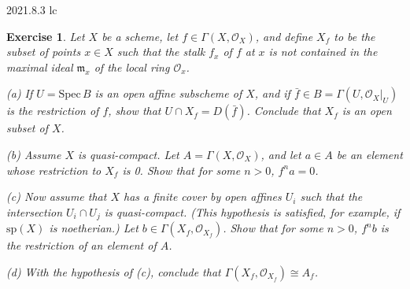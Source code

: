 \documentclass[12pt]{amsart}
\newtheorem{exe}{Exercise}[subsection]
\begin{document}
2021.8.3 lc
\begin{exe}
	\label{2.2.16}
	Let $X$ be a scheme, let $f\in\Gamma(X,\mathcal{O}_X)$, and define $X_f$ to be the subset of points $x\in X$ such that the stalk $f_x$ of $f$ at $x$ is not contained in the maximal ideal $\mathfrak{m}_x$ of the local ring $\mathcal{O}_x$.
	
	(a) If $U=\mathrm{Spec}\,B$ is an open \emph{affine} subscheme of $X$, and if $\bar{f}\in B=\Gamma(U,\mathcal{O}_X|_U)$ is the restriction of $f$, show that $U\cap X_f=D(\bar{f})$. Conclude that $X_f$ is an open subset of $X$.
	
	(b) Assume $X$ is quasi-compact. Let $A=\Gamma(X,\mathcal{O}_X)$, and let $a\in A$ be an element whose restriction to $X_f$ is 0. Show that for some $n>0$, $f^na=0$.
	
	(c) Now assume that $X$ has a finite cover by open affines $U_i$ such that the intersection $U_i\cap U_j$ is quasi-compact. (This hypothesis is satisfied, for example, if $\mathrm{sp}(X)$ is noetherian.) Let $b\in\Gamma(X_f,\mathcal{O}_{X_f})$. Show that for some $n>0$, $f^nb$ is the restriction of an element of $A$.
	
	(d) With the hypothesis of (c), conclude that $\Gamma(X_f,\mathcal{O}_{X_f})\cong A_f$.
\end{exe}
\end{document}
